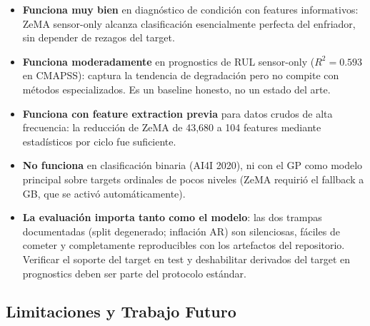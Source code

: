 \documentclass[10pt]{article}
\begin{document}
\begin{itemize}
    \item \textbf{Funciona muy bien} en diagnóstico de condición con features informativos: ZeMA sensor-only alcanza clasificación esencialmente perfecta del enfriador, sin depender de rezagos del target.
    \item \textbf{Funciona moderadamente} en prognostics de RUL sensor-only ($R^2=0.593$ en CMAPSS): captura la tendencia de degradación pero no compite con métodos especializados. Es un baseline honesto, no un estado del arte.
    \item \textbf{Funciona con feature extraction previa} para datos crudos de alta frecuencia: la reducción de ZeMA de 43,680 a 104 features mediante estadísticos por ciclo fue suficiente.
    \item \textbf{No funciona} en clasificación binaria (AI4I 2020), ni con el GP como modelo principal sobre targets ordinales de pocos niveles (ZeMA requirió el fallback a GB, que se activó automáticamente).
    \item \textbf{La evaluación importa tanto como el modelo}: las dos trampas documentadas (split degenerado; inflación AR) son silenciosas, fáciles de cometer y completamente reproducibles con los artefactos del repositorio. Verificar el soporte del target en test y deshabilitar derivados del target en prognostics deben ser parte del protocolo estándar.
\end{itemize}

\subsection{Limitaciones y Trabajo Futuro}
\end{document}
